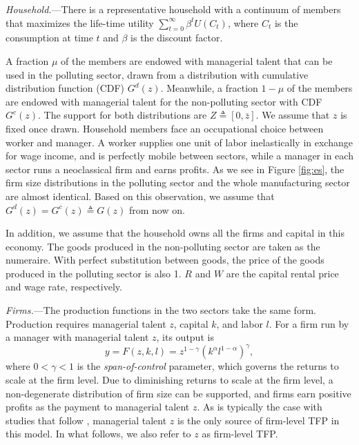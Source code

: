 \documentclass[AEJ]{AEA}
\begin{document}
\textit{Household.}---There is a representative household with a continuum of members that maximizes the life-time utility $\sum_{t=0}^{\infty} \beta^t U(C_t)$, where $C_t$ is the consumption at time $t$ and $\beta$ is the discount factor.

A fraction $\mu$ of the members are endowed with managerial talent that can be used in the polluting sector, drawn from a distribution with cumulative distribution function (CDF) $G^{d}(z)$. Meanwhile, a fraction $1-\mu$ of the members are endowed with managerial talent for the non-polluting sector with CDF $G^{c}(z)$. The support for both distributions are $Z \triangleq [0,\overline{z}]$. We assume that $z$ is fixed once drawn. Household members face an occupational choice between {worker} and {manager}. A worker supplies one unit of labor inelastically in exchange for wage income, and is perfectly mobile between sectors, while a manager in each sector runs a neoclassical firm and earns profits. As we see in Figure \ref{fig:es}, the firm size distributions in the polluting sector and the whole manufacturing sector are almost identical. Based on this observation, we assume that $G^{d}(z) = G^{c}(z) \triangleq G(z)$ from now on.

In addition, we assume that the household owns all the firms and capital in this economy. The goods produced in the non-polluting sector are taken as the numeraire. With perfect substitution between goods, the price of the goods produced in the polluting sector is also 1. $R$ and $W$ are the capital rental price and wage rate, respectively.

\textit{Firms.}---The production functions in the two sectors take the same form. Production requires managerial talent $z$, capital $k$, and labor $l$. For a firm run by a manager with managerial talent $z$, its output is
\begin{equation*}
    y = F(z,k,l) = z^{1-\gamma} (k^{\alpha}l^{1-\alpha})^{\gamma},
\end{equation*}
where $0<\gamma<1$ is the \emph{span-of-control} parameter, which governs the returns to scale at the firm level. Due to diminishing returns to scale at the firm level, a non-degenerate distribution of firm size can be supported, and firms earn positive profits as the payment to managerial talent $z$. As is typically the case with studies that follow \citet{Lucas:1978b}, managerial talent $z$ is the only source of firm-level TFP in this model. In what follows, we also refer to $z$ as firm-level TFP.
\end{document}
